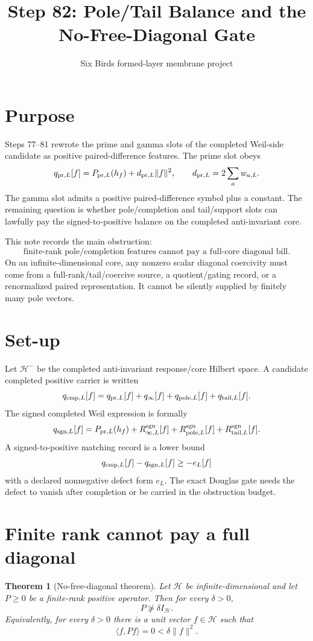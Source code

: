 \documentclass[11pt]{article}
\title{Step 82: Pole/Tail Balance and the No-Free-Diagonal Gate}
\author{Six Birds formed-layer membrane project}
\date{}
\newtheorem{theorem}{Theorem}
\newcommand{\Hc}{\mathcal H}
\newcommand{\Apr}{d_{{\rm pr},L}}
\newcommand{\qpr}{q_{{\rm pr},L}}
\newcommand{\qsgn}{q_{{\rm sgn},L}}
\newcommand{\qtail}{q_{{\rm tail},L}}
\newcommand{\qpole}{q_{{\rm pole},L}}
\newcommand{\qinfty}{q_{\infty}}
\begin{document}
\maketitle

\section{Purpose}
Steps 77--81 rewrote the prime and gamma slots of the completed Weil-side candidate as positive paired-difference features.  The prime slot obeys
\[
\qpr[f]=P_{{\rm pr},L}(h_f)+\Apr\|f\|^2,
\qquad
\Apr=2\sum_a w_{a,L}.
\]
The gamma slot admits a positive paired-difference symbol plus a constant.  The remaining question is whether pole/completion and tail/support slots can lawfully pay the signed-to-positive balance on the completed anti-invariant core.

This note records the main obstruction:
\[
\boxed{\text{finite-rank pole/completion features cannot pay a full-core diagonal bill.}}
\]
On an infinite-dimensional core, any nonzero scalar diagonal coercivity must come from a full-rank/tail/coercive source, a quotient/gating record, or a renormalized paired representation.  It cannot be silently supplied by finitely many pole vectors.

\section{Set-up}
Let \(\Hc^-\) be the completed anti-invariant response/core Hilbert space.  A candidate completed positive carrier is written
\[
q_{{\rm cmp},L}[f]
= \qpr[f]+\qinfty[f]+\qpole[f]+\qtail[f].
\]
The signed completed Weil expression is formally
\[
\qsgn[f]
= P_{{\rm pr},L}(h_f)+R^{\rm sgn}_{\infty,L}[f]
+R^{\rm sgn}_{{\rm pole},L}[f]+R^{\rm sgn}_{{\rm tail},L}[f].
\]
A signed-to-positive matching record is a lower bound
\[
q_{{\rm cmp},L}[f]-\qsgn[f]\ge -e_L[f]
\]
with a declared nonnegative defect form \(e_L\).  The exact Douglas gate needs the defect to vanish after completion or be carried in the obstruction budget.

\section{Finite rank cannot pay a full diagonal}

\begin{theorem}[No-free-diagonal theorem]
Let \(\Hc\) be infinite-dimensional and let \(P\ge0\) be a finite-rank positive operator.  Then for every \(\delta>0\),
\[
P\nsucceq \delta I_{\Hc}.
\]
Equivalently, for every \(\delta>0\) there is a unit vector \(f\in\Hc\) such that
\[
\langle f,Pf\rangle=0<\delta\|f\|^2.
\]
\end{theorem}
\end{document}
